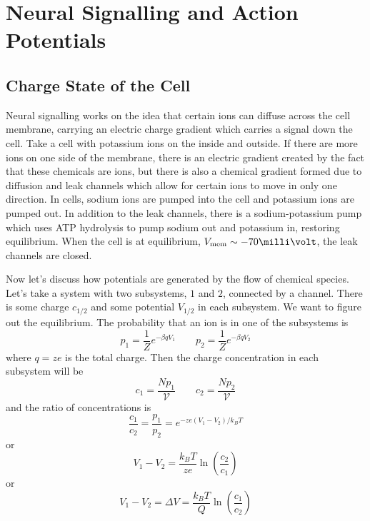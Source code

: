 \documentclass[a4paper,twoside,master.tex]{subfiles}
\begin{document}
\chapter{Neural Signalling and Action Potentials}

\section{Charge State of the Cell}\label{sec:charge_state_of_the_cell}

Neural signalling works on the idea that certain ions can diffuse across the cell membrane, carrying an electric charge gradient which carries a signal down the cell. Take a cell with potassium ions on the inside and outside. If there are more ions on one side of the membrane, there is an electric gradient created by the fact that these chemicals are ions, but there is also a chemical gradient formed due to diffusion and leak channels which allow for certain ions to move in only one direction. In cells, sodium ions are pumped into the cell and potassium ions are pumped out. In addition to the leak channels, there is a sodium-potassium pump which uses ATP hydrolysis to pump sodium out and potassium in, restoring equilibrium. When the cell is at equilibrium, $ V_{\text{mem}} \sim -70 \milli\volt $, the leak channels are closed.

Now let's discuss how potentials are generated by the flow of chemical species. Let's take a system with two subsystems, $ 1 $ and $ 2 $, connected by a channel. There is some charge $ c_{1/2} $ and some potential $ V_{1/2} $ in each subsystem. We want to figure out the equilibrium. The probability that an ion is in one of the subsystems is
\begin{equation}
    p_1 = \frac{1}{Z} e^{- \beta q V_1} \qquad p_2 = \frac{1}{Z} e^{- \beta q V_2}
\end{equation}
where $ q = ze $ is the total charge. Then the charge concentration in each subsystem will be
\begin{equation}
    c_1 = \frac{N p_1}{\mathcal{V}} \qquad c_2 = \frac{N p_2}{\mathcal{V}}
\end{equation}
and the ratio of concentrations is
\begin{equation}
    \frac{c_1}{c_2} = \frac{p_1}{p_2} = e^{-ze(V_1 - V_2)/k_B T}
\end{equation}
or
\begin{equation}
    V_1 - V_2 = \frac{k_B T}{ze} \ln(\frac{c_2}{c_1})
\end{equation}
or
\begin{equation}
    V_1 - V_2 = \Delta V = \frac{k_B T}{Q} \ln(\frac{c_1}{c_2}) \tag{Nernst Potential}
\end{equation}
\end{document}
